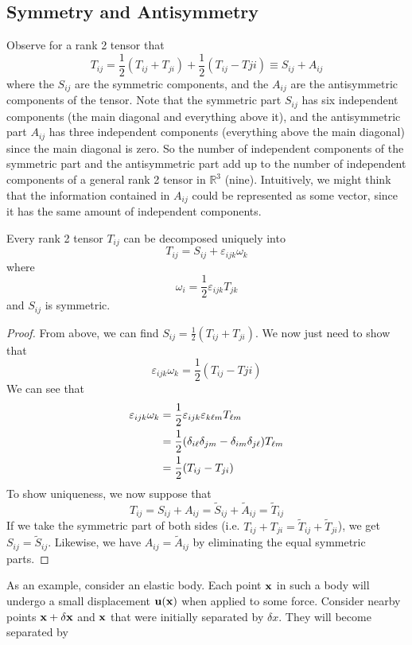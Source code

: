 \subsection{Symmetry and Antisymmetry}
Observe for a rank 2 tensor that
\[ T_{ij} = \frac{1}{2}\left( T_{ij} + T_{ji} \right) + \frac{1}{2}\left( T_{ij} - T{ji} \right) \equiv S_{ij} + A_{ij} \]
where the $S_{ij}$ are the symmetric components, and the $A_{ij}$ are the antisymmetric components of the tensor. Note that the symmetric part $S_{ij}$ has six independent components (the main diagonal and everything above it), and the antisymmetric part $A_{ij}$ has three independent components (everything above the main diagonal) since the main diagonal is zero. So the number of independent components of the symmetric part and the antisymmetric part add up to the number of independent components of a general rank 2 tensor in $\mathbb R^3$ (nine). Intuitively, we might think that the information contained in $A_{ij}$ could be represented as some vector, since it has the same amount of independent components.
\begin{proposition}
	Every rank 2 tensor $T_{ij}$ can be decomposed uniquely into
	\[ T_{ij} = S_{ij} + \varepsilon_{ijk} \omega_k \]
	where
	\[ \omega_i = \frac{1}{2}\varepsilon_{ijk} T_{jk} \]
	and $S_{ij}$ is symmetric.
\end{proposition}
\begin{proof}
	From above, we can find $S_{ij} = \frac{1}{2}\left( T_{ij} + T_{ji} \right)$. We now just need to show that
	\[ \varepsilon_{ijk} \omega_k = \frac{1}{2}\left( T_{ij} - T{ji} \right) \]
	We can see that
	\begin{align*}
		\varepsilon_{ijk} \omega_k & = \frac{1}{2}\varepsilon_{ijk} \varepsilon_{k\ell m} T_{\ell m}                      \\
		                           & = \frac{1}{2}\qty(\delta_{i\ell} \delta_{jm} - \delta_{im}\delta_{j\ell}) T_{\ell m} \\
		                           & = \frac{1}{2}\qty(T_{ij} - T_{ji})
	\end{align*}
	To show uniqueness, we now suppose that
	\[ T_{ij} = S_{ij} + A_{ij} = \widetilde{S}_{ij} + \widetilde{A}_{ij} = \widetilde{T}_{ij} \]
	If we take the symmetric part of both sides (i.e. $T_{ij} + T_{ji} = \widetilde{T}_{ij} + \widetilde{T}_{ji}$), we get $S_{ij} = \widetilde{S}_{ij}$. Likewise, we have $A_{ij} = \widetilde{A}_{ij}$ by eliminating the equal symmetric parts.
\end{proof}
\noindent As an example, consider an elastic body. Each point $\vb x$ in such a body will undergo a small displacement $\vb u(\vb x)$ when applied to some force. Consider nearby points $\vb x + \delta\vb x$ and $\vb x$ that were initially separated by $\delta x$. They will become separated by
